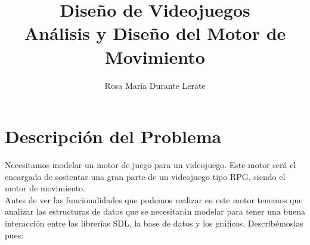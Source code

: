 \documentclass[a4paper,10pt]{article}
\title{Diseño de Videojuegos \\ Análisis y Diseño del Motor de Movimiento }
\author{Rosa María Durante Lerate}
\begin{document}
\maketitle


\tableofcontents

\section{Descripción del Problema}

Necesitamos modelar un motor de juego para un videojuego. Este motor será el
encargado de sostentar una gran parte de un videojuego tipo RPG, siendo el motor
de movimiento. \\
 
Antes de ver las funcionalidades que podemos realizar en este motor tenemos que
analizar las estructuras de datos que se necesitarán modelar para tener una
buena interacción entre las librerías SDL, la base de datos y los gráficos.
Describémoslas pues:
\end{document}

